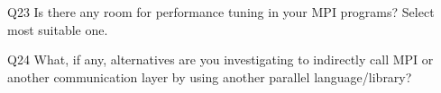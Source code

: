 \begin{description}%
\item{Q23} Is there any room for performance tuning in your MPI programs? Select most suitable one.%
\item{Q24} What, if any, alternatives are you investigating to indirectly call MPI or another communication layer by using another parallel language/library?%
\end{description}%
